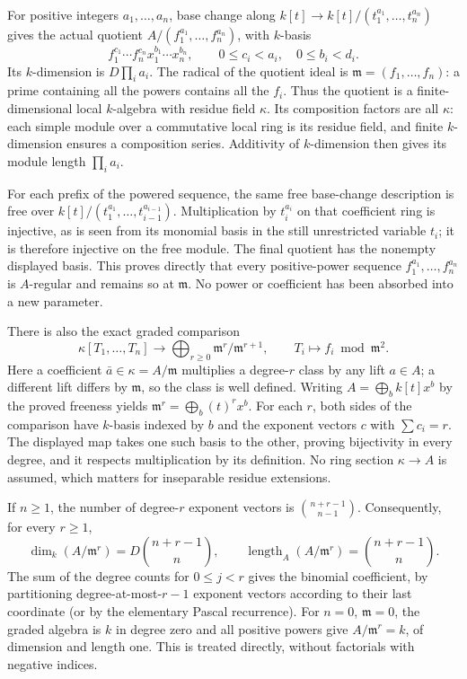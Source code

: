 For positive integers \(a_1,\ldots,a_n\), base change along \(k[t]\to k[t]/(t_1^{a_1},\ldots,t_n^{a_n})\) gives the actual quotient \(A/(f_1^{a_1},\ldots,f_n^{a_n})\), with \(k\)-basis \[
 f_1^{c_1}\cdots f_n^{c_n}x_1^{b_1}\cdots x_n^{b_n},
 \qquad 0\leq c_i<a_i,\quad 0\leq b_i<d_i.
\] Its \(k\)-dimension is \(D\prod_i a_i\). The radical of the quotient ideal is \(\mathfrak m=(f_1,\ldots,f_n)\): a prime containing all the powers contains all the \(f_i\). Thus the quotient is a finite-dimensional local \(k\)-algebra with residue field \(\kappa\). Its composition factors are all \(\kappa\): each simple module over a commutative local ring is its residue field, and finite \(k\)-dimension ensures a composition series. Additivity of \(k\)-dimension then gives its module length \(\prod_i a_i\).

For each prefix of the powered sequence, the same free base-change description is free over \(k[t]/(t_1^{a_1},\ldots,t_{i-1}^{a_{i-1}})\). Multiplication by \(t_i^{a_i}\) on that coefficient ring is injective, as is seen from its monomial basis in the still unrestricted variable \(t_i\); it is therefore injective on the free module. The final quotient has the nonempty displayed basis. This proves directly that every positive-power sequence \(f_1^{a_1},\ldots,f_n^{a_n}\) is \(A\)-regular and remains so at \(\mathfrak m\). No power or coefficient has been absorbed into a new parameter.

There is also the exact graded comparison \[
 \kappa[T_1,\ldots,T_n]\longrightarrow
 \bigoplus_{r\geq0}\mathfrak m^r/\mathfrak m^{r+1},
 \qquad T_i\longmapsto f_i\bmod\mathfrak m^2.
\] Here a coefficient \(\bar a\in\kappa=A/\mathfrak m\) multiplies a degree-\(r\) class by any lift \(a\in A\); a different lift differs by \(\mathfrak m\), so the class is well defined. Writing \(A=\bigoplus_b k[t]x^b\) by the proved freeness yields \(\mathfrak m^r=\bigoplus_b(t)^r x^b\). For each \(r\), both sides of the comparison have \(k\)-basis indexed by \(b\) and the exponent vectors \(c\) with \(\sum c_i=r\). The displayed map takes one such basis to the other, proving bijectivity in every degree, and it respects multiplication by its definition. No ring section \(\kappa\to A\) is assumed, which matters for inseparable residue extensions.

If \(n\geq1\), the number of degree-\(r\) exponent vectors is \(\binom{n+r-1}{n-1}\). Consequently, for every \(r\geq1\), \[
 \dim_k(A/\mathfrak m^r)=D\binom{n+r-1}{n},
 \qquad
 \operatorname{length}_A(A/\mathfrak m^r)=\binom{n+r-1}{n}.
\] The sum of the degree counts for \(0\leq j<r\) gives the binomial coefficient, by partitioning degree-at-most-\(r-1\) exponent vectors according to their last coordinate (or by the elementary Pascal recurrence). For \(n=0\), \(\mathfrak m=0\), the graded algebra is \(k\) in degree zero and all positive powers give \(A/\mathfrak m^r=k\), of dimension and length one. This is treated directly, without factorials with negative indices.

